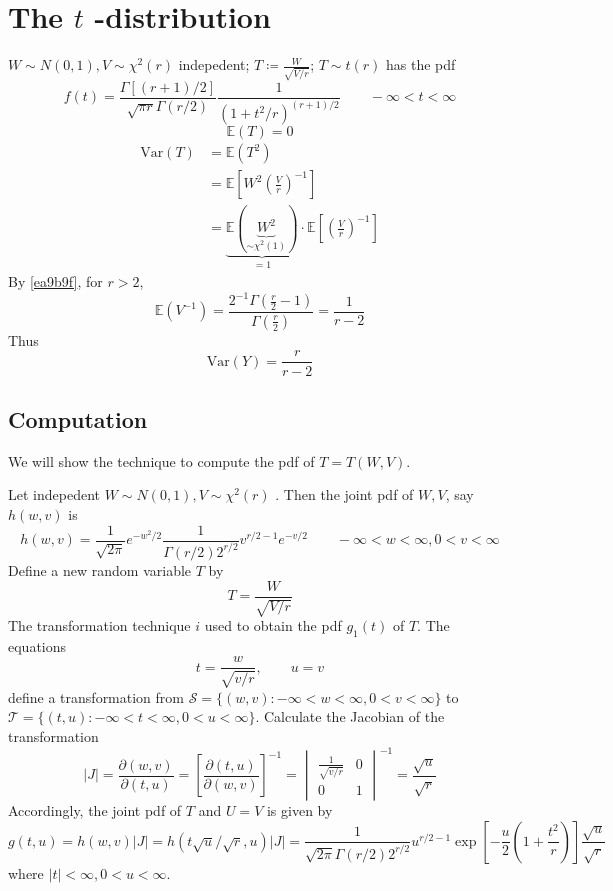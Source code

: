 \section{The \texorpdfstring{$t$}{t} -distribution}

$W\sim N(0,1),V\sim \chi^{2}(r)$ indepedent; $T\coloneqq\frac{W}{\sqrt{ V/r  }}$; $T\sim t(r)$ has the pdf
\[
f(t)=\frac{\Gamma[(r+1)/2 ]}{\sqrt{ \pi r }\Gamma(r/2 )}\frac{1}{(1+t^{2}/r )^{(r+1)/2}}\qquad -\infty<t<\infty
\]
\[
\mathbb{E}(T)=0
\]
\[
\begin{aligned}
\mathrm{Var}(T) & =\mathbb{E}(T^2) \\
 & =\mathbb{E}\left[ W^{2}\left( \frac{V}{r} \right)^{-1 } \right] \\
 & =\underbrace{ \mathbb{E}(\underbrace{ W^{2} }_{ \sim \chi^{2}(1) }) }_{ =1 }\cdot\mathbb{E}\left[ \left( \frac{V}{r} \right)^{-1 } \right] 
\end{aligned}
\]
By \cref{ea9b9f}, for $r>2$,
\[
\mathbb{E}(V^{-1})=\frac{2^{-1}\Gamma\left( \frac{r}{2}-1 \right)}{\Gamma\left( \frac{r}{2} \right)}=\frac{1}{r-2}
\]
Thus
\[
\mathrm{Var}(Y)=\frac{r}{r-2}
\]
\subsection{Computation}

\begin{note}
We will show the technique to compute the pdf of  $T=T(W,V)$.
\end{note}
Let indepedent $W\sim N(0,1),V\sim \chi^{2}(r)$ . Then the joint pdf of $W,V$, say $h(w,v)$ is
\[
h(w,v)=\frac{1}{\sqrt{ 2\pi }}e^{ -w^{2}/2  }\frac{1}{\Gamma(r/2 )2^{r / 2 }}v^{r/2 -1}e^{ -v/2  }\qquad -\infty<w<\infty,0<v<\infty
\]
Define a new random variable $T$ by
\[
T=\frac{W}{\sqrt{ V/r  }}
\]
The transformation technique $i$ used to obtain the pdf $g_1(t)$ of $T$. The equations
\[
t=\frac{w}{\sqrt{ v/r  }},\qquad u=v
\]
define a transformation from $\mathcal{S}=\{ (w,v):-\infty<w<\infty,0<v<\infty \}$ to $\mathcal{T}=\{ (t,u):-\infty<t<\infty,0<u<\infty  \}$. Calculate the Jacobian of the transformation
\[
\lvert J \rvert =\frac{ \partial (w,v) }{ \partial (t,u) } =\left[ \frac{\partial (t,u)}{\partial (w,v)} \right]^{-1}=\begin{vmatrix}
\frac{1}{\sqrt{ v/r  }}  & 0 \\
0 & 1  
\end{vmatrix}^{-1}=\frac{\sqrt{ u }}{\sqrt{ r }}
\]
Accordingly, the joint pdf of $T$ and $U=V$ is given by
\[
g(t,u)=h(w,v)\lvert J \rvert =h(t\sqrt{ u }/\sqrt{ r },u)\lvert J \rvert =\frac{1}{\sqrt{ 2\pi }\Gamma(r/2 )2^{r/2 }}u^{r/2 -1}\exp\left[ -\frac{u}{2}\left( 1+\frac{t^{2}}{r} \right) \right]\frac{\sqrt{ u }}{\sqrt{ r }}
\]
where $\lvert t \rvert <\infty,0<u<\infty$.

